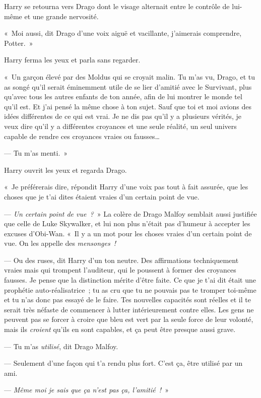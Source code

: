 Harry se retourna vers Drago dont le visage alternait entre le contrôle de lui-même et une grande nervosité.

«~Moi aussi, dit Drago d'une voix aiguë et vacillante, j'aimerais comprendre, Potter.~»

Harry ferma les yeux et parla sans regarder.

«~Un garçon élevé par des Moldus qui se croyait malin.
Tu m'as vu, Drago, et tu as songé qu'il serait éminemment utile de se lier d'amitié avec le Survivant, plus qu'avec tous les autres enfants de ton année, afin de lui montrer le monde tel qu'il est.
Et j'ai pensé la même chose à ton sujet.
Sauf que toi et moi avions des idées différentes de ce qui est vrai.
Je ne dis pas qu'il y a plusieurs vérités, je veux dire qu'il y a différentes croyances et une seule réalité, un seul univers capable de rendre ces croyances vraies ou fausses…

--- Tu m'as menti.~»

Harry ouvrit les yeux et regarda Drago.

«~Je préférerais dire, répondit Harry d'une voix pas tout à fait assurée, que les choses que je t'ai dites étaient vraies d'un certain point de vue.

--- \emph{Un certain point de vue~?}~» La colère de Drago Malfoy semblait aussi justifiée que celle de Luke Skywalker, et lui non plus n'était pas d'humeur à accepter les excuses d'Obi-Wan.
«~Il y a un mot pour les choses vraies d'un certain point de vue.
On les appelle des \emph{mensonges~!}

--- Ou des ruses, dit Harry d'un ton neutre.
Des affirmations techniquement vraies mais qui trompent l'auditeur, qui le poussent à former des croyances fausses.
Je pense que la distinction mérite d'être faite.
Ce que je t'ai dit était une prophétie auto-réalisatrice~; tu as cru que tu ne pouvais pas te tromper toi-même et tu n'as donc pas essayé de le faire.
Tes nouvelles capacités sont réelles et il te serait très néfaste de commencer à lutter intérieurement contre elles.
Les gens ne peuvent pas se forcer à croire que bleu est vert par la seule force de leur volonté, mais ils \emph{croient} qu'ils en sont capables, et ça peut être presque aussi grave.

--- Tu m'as \emph{utilisé}, dit Drago Malfoy.

--- Seulement d'une façon qui t'a rendu plus fort.
C'est ça, être utilisé par un ami.

--- \emph{Même moi je sais que ça n'est pas ça, l'amitié~!}~»

